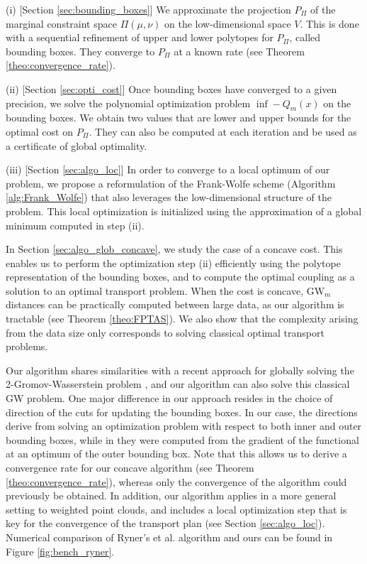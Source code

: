 \documentclass{article}
\newcommand{\1}{\mathbf{1}}
\newcommand{\GW}{\mathrm{GW}}
\theoremstyle{definition}
\theoremstyle{remark}
\begin{document}
(i) [Section \ref{sec:bounding_boxes}] We approximate the projection $P_\Pi$ of the marginal constraint space $\Pi(\mu,\nu)$ on the low-dimensional space $V$. This is done with a sequential refinement of upper and lower polytopes for $P_\Pi$, called bounding boxes. They converge to $P_\Pi$ at a known rate (see Theorem \ref{theo:convergence_rate}).

(ii) [Section \ref{sec:opti_cost}] Once bounding boxes have converged to a given precision, we solve the polynomial optimization problem $\inf -Q_m(x)$ on the bounding boxes. We obtain two values that are lower and upper bounds for the  optimal cost on $P_\Pi $.  They can also be computed at each iteration and be used as a certificate of global optimality. 

(iii) [Section \ref{sec:algo_loc}] In order to converge to a local optimum of our problem, we propose a reformulation of the Frank-Wolfe scheme (Algorithm \ref{alg:Frank_Wolfe}) that also leverages the low-dimensional structure of the problem. This local optimization is initialized using the approximation of a global minimum computed in step (ii).

In Section \ref{sec:algo_glob_concave}, we study the case of a concave cost. This enables us to perform the optimization step (ii) efficiently using the polytope representation of the bounding boxes, and to compute the optimal coupling as a solution to an optimal transport problem. When the cost is concave, $\GW_m$ distances can be practically computed between large data, as our algorithm is tractable (see Theorem \ref{theo:FPTAS}). We also show that the complexity arising from the data size only corresponds to solving classical optimal transport problems.

Our algorithm shares similarities with a recent approach for globally solving the 2-Gromov-Wasserstein problem \cite{ryner2023globally}, and our algorithm can also solve this classical GW problem. One major difference in our approach resides in the choice of direction of the cuts for updating the bounding boxes. In our case, the directions derive from solving an optimization problem with respect to both inner and outer bounding boxes, while in \cite{ryner2023globally} they were computed from the gradient of the functional at an optimum of the outer bounding box. Note that this allows us to derive a convergence rate for our concave algorithm (see Theorem \ref{theo:convergence_rate}), whereas only the convergence of the algorithm could previously be obtained. In addition, our algorithm applies in a more general setting to weighted point clouds, and includes a local optimization step that is key for the convergence of the transport plan (see Section \ref{sec:algo_loc}). Numerical comparison of Ryner's et al. algorithm \cite{ryner2023globally} and ours can be found in Figure \ref{fig:bench_ryner}.
\end{document}
